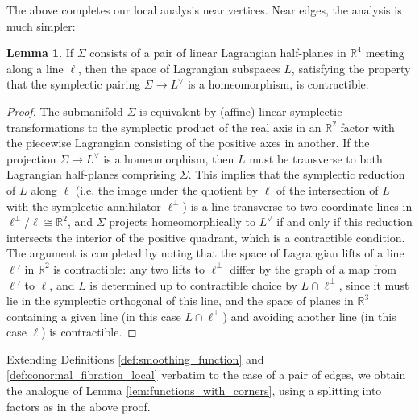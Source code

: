 \documentclass[11pt]{article}
\newcommand{\bR}{\mathbb{R}}
\theoremstyle{definition}
\newtheorem{lemma}{Lemma}
\begin{document}
  
 The above completes our local analysis near vertices. Near edges, the analysis is much simpler:
 \begin{lemma} \label{lem:transverse_plane_near_edge}
   If $\Sigma$ consists of a pair of linear Lagrangian half-planes in $\bR^4$ meeting along a line $\ell$, then the space of Lagrangian subspaces $L$, satisfying the property that the symplectic pairing $\Sigma \to L^\vee$ is a homeomorphism, is contractible.
 \end{lemma}
 \begin{proof}
   The submanifold $\Sigma$ is equivalent by (affine) linear symplectic transformations to the symplectic product of the real axis in an $\bR^2$ factor with the piecewise Lagrangian consisting of the positive axes in another. If the projection $\Sigma \to L^\vee$ is a homeomorphism, then $L$ must be transverse to both Lagrangian half-planes comprising $\Sigma$. This implies that the symplectic reduction of $L$ along  $\ell$ (i.e. the image under the quotient by $\ell$ of the intersection of $L$ with the symplectic annihilator $\ell^\perp$) is a line transverse to two coordinate lines in $\ell^\perp/\ell \cong \bR^2 $, and $\Sigma$ projects homeomorphically to $L^\vee$ if and only if this reduction intersects the interior of the positive quadrant, which is a contractible condition. The argument is completed by noting that the space of Lagrangian lifts of a line $\ell'$ in $\bR^2$ is contractible: any two lifts to $\ell^\perp$ differ by the graph of a map from $\ell'$ to $\ell$, and $L$ is determined up to contractible choice by $L \cap \ell^\perp$, since it must lie in the symplectic orthogonal of this line, and the space of planes in $\bR^3$ containing a given line (in this case $L \cap \ell^\perp$) and avoiding another line (in this case $\ell$) is contractible.
 \end{proof}
 Extending Definitions \ref{def:smoothing_function} and \ref{def:conormal_fibration_local} verbatim to the case of a pair of edges, we obtain the analogue of Lemma \ref{lem:functions_with_corners}, using a splitting into factors as in the above proof.
\end{document}
